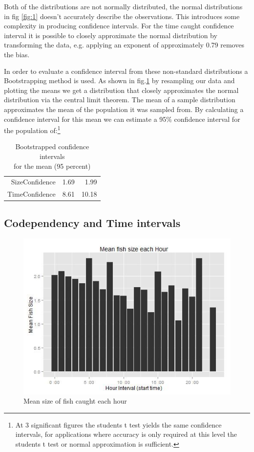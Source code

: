 \documentclass{article}\usepackage[]{graphicx}\usepackage[]{color}
\begin{document}
Both of the distributions are not normally distributed, the normal distributions in fig \ref{fig:1} doesn't accurately describe the observations. This introduces some complexity in producing confidence intervals. For the time caught confidence interval it is possible to closely approximate the normal distribution by transforming the data, e.g. applying an exponent of approximately 0.79 removes the bias.

In order to evaluate a confidence interval from these non-standard distributions a Bootstrapping method is used. As shown in fig.\ref{fig:three} by resampling our data and plotting the means we get a distribution that closely approximates the normal distribution via the central limit theorem. The mean of a sample distribution approximates the mean of the population it was sampled from. By calculating a confidence interval for this mean we can estimate a 95\% confidence interval for the population of:\footnote{At 3 significant figures the students t test yields the same confidence intervals, for applications where accuracy is only required at this level the students t test or normal approximation is sufficient.}

\begin{table}[ht]
\centering
\begin{tabular}{rrr}
  \hline
  \hline
SizeConfidence & 1.69 & 1.99 \\ 
  TimeConfidence & 8.61 & 10.18 \\ 
   \hline
\end{tabular}
\caption{Bootstrapped confidence intervals \\ for the mean (95 percent)} 
\end{table}


\subsection{Codependency and Time intervals}






\begin{figure}
  \includegraphics[width=0.9\linewidth]{figure4.jpg}
  \caption{Mean size of fish caught each hour}
  \label{fig:three}
\end{figure}
\end{document}
